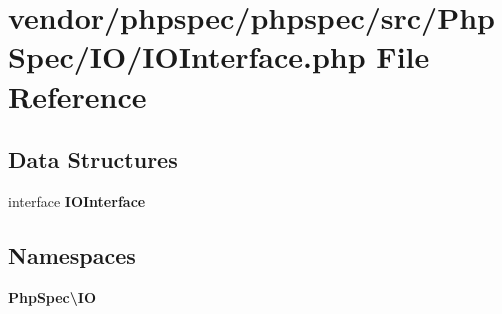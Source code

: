 \section{vendor/phpspec/phpspec/src/\+Php\+Spec/\+I\+O/\+I\+O\+Interface.php File Reference}
\label{_i_o_interface_8php}
\subsection*{Data Structures}
\begin{DoxyCompactItemize}
\item 
interface {\bf I\+O\+Interface}
\end{DoxyCompactItemize}
\subsection*{Namespaces}
\begin{DoxyCompactItemize}
\item 
 {\bf Php\+Spec\textbackslash{}\+I\+O}
\end{DoxyCompactItemize}
